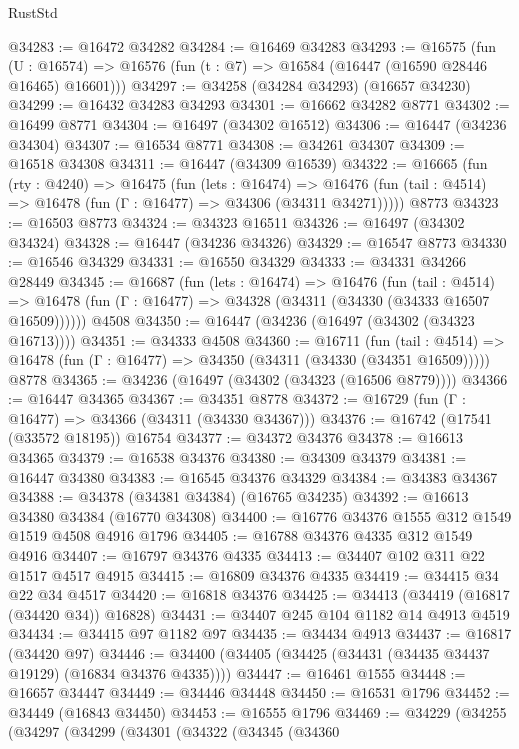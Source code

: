 \begin{lexlean}{RustStd}
\begin{coremodule}
@34283 := @16472 @34282
@34284 := @16469 @34283
@34293 := @16575
    (fun (U : @16574) => @16576 (fun (t : @7) => @16584 (@16447 (@16590 @28446 @16465) @16601)))
@34297 := @34258 (@34284 @34293) (@16657 @34230)
@34299 := @16432 @34283 @34293
@34301 := @16662 @34282 @8771
@34302 := @16499 @8771
@34304 := @16497 (@34302 @16512)
@34306 := @16447 (@34236 @34304)
@34307 := @16534 @8771
@34308 := @34261 @34307
@34309 := @16518 @34308
@34311 := @16447 (@34309 @16539)
@34322 := @16665
    (fun (rty : @4240) =>
    @16475
      (fun (lets : @16474) =>
      @16476 (fun (tail : @4514) => @16478 (fun (Γ : @16477) => @34306 (@34311 @34271)))))
    @8773
@34323 := @16503 @8773
@34324 := @34323 @16511
@34326 := @16497 (@34302 @34324)
@34328 := @16447 (@34236 @34326)
@34329 := @16547 @8773
@34330 := @16546 @34329
@34331 := @16550 @34329
@34333 := @34331 @34266 @28449
@34345 := @16687
    (fun (lets : @16474) =>
    @16476
      (fun (tail : @4514) =>
      @16478 (fun (Γ : @16477) => @34328 (@34311 (@34330 (@34333 @16507 @16509))))))
    @4508
@34350 := @16447 (@34236 (@16497 (@34302 (@34323 @16713))))
@34351 := @34333 @4508
@34360 := @16711
    (fun (tail : @4514) => @16478 (fun (Γ : @16477) => @34350 (@34311 (@34330 (@34351 @16509)))))
    @8778
@34365 := @34236 (@16497 (@34302 (@34323 (@16506 @8779))))
@34366 := @16447 @34365
@34367 := @34351 @8778
@34372 := @16729 (fun (Γ : @16477) => @34366 (@34311 (@34330 @34367)))
@34376 := @16742 (@17541 (@33572 @18195)) @16754
@34377 := @34372 @34376
@34378 := @16613 @34365
@34379 := @16538 @34376
@34380 := @34309 @34379
@34381 := @16447 @34380
@34383 := @16545 @34376 @34329
@34384 := @34383 @34367
@34388 := @34378 (@34381 @34384) (@16765 @34235)
@34392 := @16613 @34380 @34384 (@16770 @34308)
@34400 := @16776 @34376 @1555 @312 @1549 @1519 @4508 @4916 @1796
@34405 := @16788 @34376 @4335 @312 @1549 @4916
@34407 := @16797 @34376 @4335
@34413 := @34407 @102 @311 @22 @1517 @4517 @4915
@34415 := @16809 @34376 @4335
@34419 := @34415 @34 @22 @34 @4517
@34420 := @16818 @34376
@34425 := @34413 (@34419 (@16817 (@34420 @34)) @16828)
@34431 := @34407 @245 @104 @1182 @14 @4913 @4519
@34434 := @34415 @97 @1182 @97
@34435 := @34434 @4913
@34437 := @16817 (@34420 @97)
@34446 := @34400 (@34405 (@34425 (@34431 (@34435 @34437 @19129) (@16834 @34376 @4335))))
@34447 := @16461 @1555
@34448 := @16657 @34447
@34449 := @34446 @34448
@34450 := @16531 @1796
@34452 := @34449 (@16843 @34450)
@34453 := @16555 @1796
@34469 := @34229
    (@34255
      (@34297
        (@34299
          (@34301
            (@34322
              (@34345
                (@34360

\end{coremodule}
\end{lexlean}
